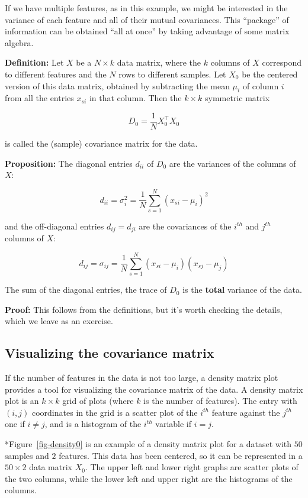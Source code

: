 \documentclass[
  11pt,
  letterpaper,
]{scrbook}
\theoremstyle{plain}
\theoremstyle{remark}
\begin{document}
If we have multiple features, as in this example, we might be interested
in the variance of each feature and all of their mutual covariances.
This ``package'' of information can be obtained ``all at once'' by
taking advantage of some matrix algebra.

\textbf{Definition:} Let \(X\) be a \(N\times k\) data matrix, where the
\(k\) columns of \(X\) correspond to different features and the \(N\)
rows to different samples. Let \(X_{0}\) be the centered version of this
data matrix, obtained by subtracting the mean \(\mu_{i}\) of column
\(i\) from all the entries \(x_{si}\) in that column. Then the
\(k\times k\) symmetric matrix

\[
D_{0} = \frac{1}{N}X_{0}^{\intercal}X_{0}
\]

is called the (sample) covariance matrix for the data.

\textbf{Proposition:} The diagonal entries \(d_{ii}\) of \(D_{0}\) are
the variances of the columns of \(X\):

\[
d_{ii} = \sigma_{i}^2 = \frac{1}{N}\sum_{s=1}^{N}(x_{si}-\mu_i)^2
\]

and the off-diagonal entries \(d_{ij} = d_{ji}\) are the covariances of
the \(i^{th}\) and \(j^{th}\) columns of \(X\):

\[
d_{ij} = \sigma_{ij} = \frac{1}{N}\sum_{s=1}^{N}(x_{si}-\mu_{i})(x_{sj}-\mu_{j})
\]

The sum of the diagonal entries, the trace of \(D_{0}\) is the
\textbf{total} variance of the data.

\textbf{Proof:} This follows from the definitions, but it's worth
checking the details, which we leave as an exercise.

\hypertarget{sec-visualizecovar}{%
\subsection{Visualizing the covariance
matrix}\label{sec-visualizecovar}}

If the number of features in the data is not too large, a density matrix
plot provides a tool for visualizing the covariance matrix of the data.
A density matrix plot is an \(k\times k\) grid of plots (where \(k\) is
the number of features). The entry with \((i,j)\) coordinates in the
grid is a scatter plot of the \(i^{th}\) feature against the \(j^{th}\)
one if \(i\not=j\), and is a histogram of the \(i^{th}\) variable if
\(i=j\).

*Figure~\ref{fig-density0} is an example of a density matrix plot for a
dataset with \(50\) samples and \(2\) features. This data has been
centered, so it can be represented in a \(50\times 2\) data matrix
\(X_{0}\). The upper left and lower right graphs are scatter plots of
the two columns, while the lower left and upper right are the histograms
of the columns.
\end{document}
